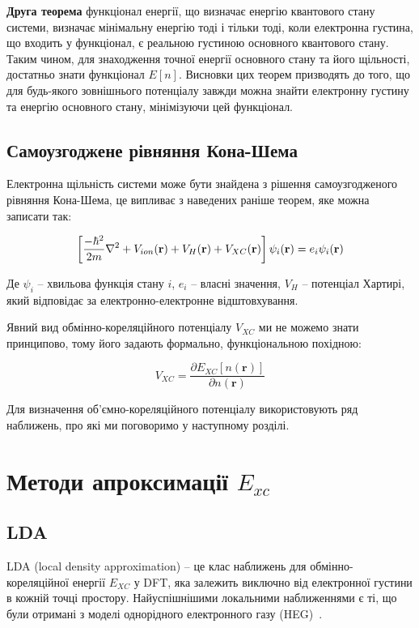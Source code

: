 \textbf{Друга теорема} функціонал енергії, що визначає енергію квантового стану системи, визначає мінімальну енергію тоді і тільки тоді, коли електронна густина, що входить у функціонал, є реальною густиною основного квантового стану.
Таким чином, для знаходження точної енергії основного стану та його щільності, достатньо знати функціонал $E[n]$. Висновки цих теорем призводять до того, що для будь-якого зовнішнього потенціалу завжди можна знайти електронну густину та енергію основного стану, мінімізуючи цей функціонал.


\subsection{Самоузгоджене рівняння Кона-Шема}
Електронна щільність системи може бути знайдена з рішення самоузгодженого рівняння Кона-Шема, це випливає з наведених раніше теорем, яке можна записати так:

\begin{equation}
    \left[{{-\hbar^2}\over{2m}}\nabla^2+V_{ion}(\textbf{r})+V_H(\textbf{r})+V_{XC}(\textbf{r})\right]\psi_i(\textbf{r}) = e_i\psi_i(\textbf{r})
\end{equation}

Де $\psi_i$ -- хвильова функція стану $i$, $e_i$ -- власні значення, $V_H$ -- потенціал Хартирі, який відповідає за електронно-електронне відштовхування.

Явний вид обмінно-кореляційного потенціалу $V_{XC}$ ми не можемо знати принципово, тому його задають формально, функціональною похідною: 

\begin{equation}
    V_{XC} = \frac{\partial E_{XC}[n(\textbf{r})]}{\partial n(\textbf{r})}
\end{equation}

Для визначення об'ємно-кореляційного потенціалу використовують ряд наближень, про які ми поговоримо у наступному розділі.


\section{Методи апроксимації \textbf{$E_{xc}$}}
\subsection{LDA}
LDA (local density approximation) -- це клас наближень для обмінно-кореляційної енергії $E_{XC}$ у DFT, яка залежить виключно від електронної густини в кожній точці простору. Найуспішнішими локальними наближеннями є ті, що були отримані з моделі однорідного електронного газу (HEG)~\cite{Hohenberg&Khon}. 

